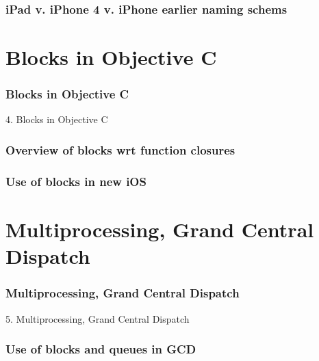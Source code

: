 \documentclass[10pt]{beamer}
\begin{document}
    
\begin{frame}[fragile]
  \frametitle{iPad v. iPhone 4 v. iPhone earlier naming schems}
  
\end{frame}

    

   
  

  
    
\section{Blocks in Objective C}
\begin{frame}[fragile]
  \frametitle{Blocks in Objective C}
  4. Blocks in Objective C
\end{frame}


    
\begin{frame}[fragile]
  \frametitle{Overview of blocks wrt function closures}
  
\end{frame}

    
\begin{frame}[fragile]
  \frametitle{Use of blocks in new iOS}
  
\end{frame}

    

   
  

  
    
\section{Multiprocessing, Grand Central Dispatch}
\begin{frame}[fragile]
  \frametitle{Multiprocessing, Grand Central Dispatch}
  5. Multiprocessing, Grand Central Dispatch
\end{frame}


    
\begin{frame}[fragile]
  \frametitle{Use of blocks and queues in GCD}
  
\end{frame}

    

   
\end{document}
